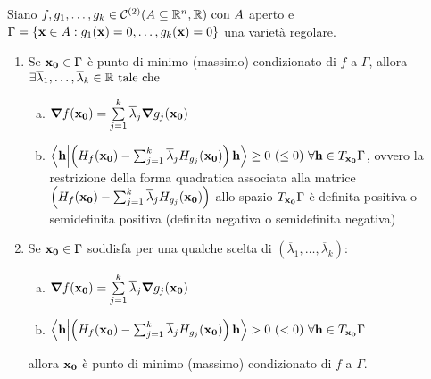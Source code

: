 \begin{theorem}
    Siano $f,g_1,\dots,g_k \in \mathcal{C}^{(2)}(A\subseteq\mathbb{R}^n, \mathbb{R}) \text{ con } A$ aperto e $\Gamma = \{ \vb{x} \in A: g_1 (\vb{x})=0, \dots, g_k(\vb{x})=0 \}$ una varietà regolare.
    \begin{enumerate}
        \item Se $\vb{x_0} \in \Gamma$ è punto di minimo (massimo) condizionato di $f$ a $\Gamma$, allora $\exists \overline{\lambda}_1,\dots,\overline{\lambda}_k \in \mathbb{R} \text{ tale che }$
        \begin{enumerate}[a.]
            \item $\grad f(\vb{x_0})=\sum\limits_{j=1}^k \overline{\lambda}_j \grad g_j(\vb{x_0})$
            \item $\ip{\vb{h}}{\left( H_f(\vb{x_0})-\sum_{j=1}^k\overline{\lambda}_j H_{g_j}(\vb{x_0}) \right)\vb{h}} \geq 0 \ (\leq 0) \ \forall \vb{h} \in T_{\vb{x_0}}\Gamma$, ovvero la restrizione della forma quadratica associata alla matrice $\left( H_f(\vb{x_0})-\sum_{j=1}^k\overline{\lambda}_j H_{g_j}(\vb{x_0}) \right)$ allo spazio $T_{\vb{x_0}}\Gamma$ è definita positiva o semidefinita positiva (definita negativa o semidefinita negativa)
        \end{enumerate}
        \item Se $\vb{x_0} \in \Gamma$ soddisfa per una qualche scelta di $(\overline{\lambda}_1,\dots,\overline{\lambda}_k)$:
        \begin{enumerate}[a.]
            \item $\grad f(\vb{x_0})=\sum\limits_{j=1}^k\overline{\lambda}_j \grad g_j (\vb{x_0})$
            \item $\ip{\vb{h}}{\left( H_f(\vb{x_0})-\sum_{j=1}^k\overline{\lambda}_j H_{g_j}(\vb{x_0}) \right)\vb{h}} > 0\ (<0) \ \forall \vb{h} \in T_{\vb{x_0}}\Gamma$
        \end{enumerate}
        allora $\vb{x_0}$ è punto di minimo (massimo) condizionato di $f$ a $\Gamma$.
    \end{enumerate}
\end{theorem}

